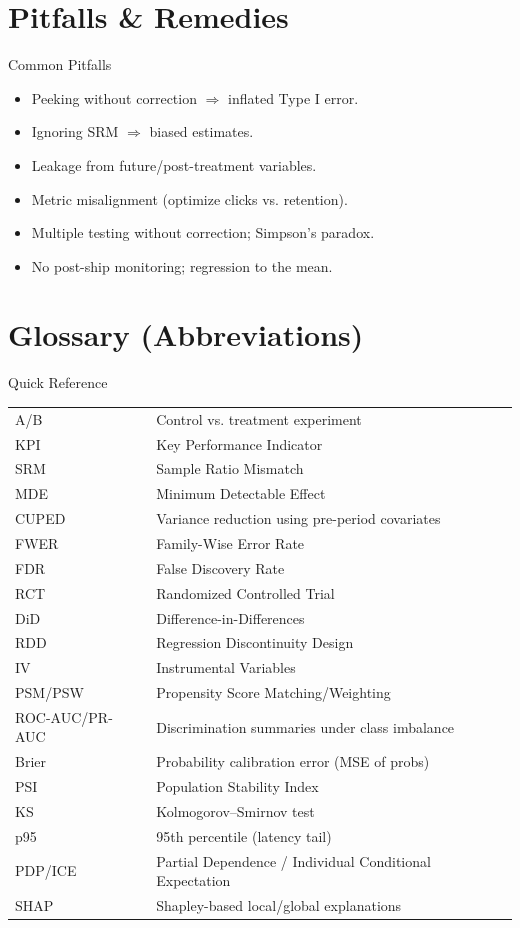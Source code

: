 \documentclass[aspectratio=169]{beamer}
\begin{document}
\section{Pitfalls \& Remedies}
\begin{frame}{Common Pitfalls}
  \begin{itemize}
    \item Peeking without correction $\Rightarrow$ inflated Type I error.
    \item Ignoring SRM $\Rightarrow$ biased estimates.
    \item Leakage from future/post-treatment variables.
    \item Metric misalignment (optimize clicks vs. retention).
    \item Multiple testing without correction; Simpson's paradox.
    \item No post-ship monitoring; regression to the mean.
  \end{itemize}
\end{frame}

\section{Glossary (Abbreviations)}
\begin{frame}{Quick Reference}
\small
\begin{tabular}{@{}ll@{}}
\toprule
A/B & Control vs. treatment experiment \\
KPI & Key Performance Indicator \\
SRM & Sample Ratio Mismatch \\
MDE & Minimum Detectable Effect \\
CUPED & Variance reduction using pre-period covariates \\
FWER & Family-Wise Error Rate \\
FDR & False Discovery Rate \\
RCT & Randomized Controlled Trial \\
DiD & Difference-in-Differences \\
RDD & Regression Discontinuity Design \\
IV & Instrumental Variables \\
PSM/PSW & Propensity Score Matching/Weighting \\
ROC-AUC/PR-AUC & Discrimination summaries under class imbalance \\
Brier & Probability calibration error (MSE of probs) \\
PSI & Population Stability Index \\
KS & Kolmogorov--Smirnov test \\
p95 & 95th percentile (latency tail) \\
PDP/ICE & Partial Dependence / Individual Conditional Expectation \\
SHAP & Shapley-based local/global explanations \\
\bottomrule
\end{tabular}
\end{frame}
\end{document}
